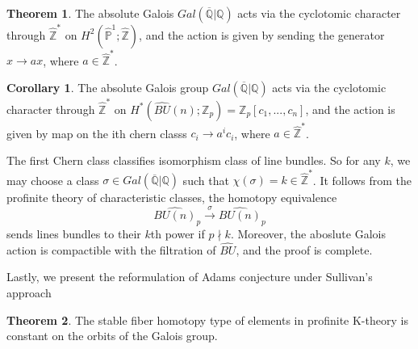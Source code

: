 \documentclass{article}
\theoremstyle{definition}
\newtheorem{theorem}{Theorem}[section]
\theoremstyle{definition}
\theoremstyle{definition}
\theoremstyle{definition}
\theoremstyle{definition}
\theoremstyle{definition}
\newtheorem{corollary}{Corollary}[theorem]
\theoremstyle{definition}
\begin{document}
\begin{tcolorbox}[colback=red!5!white,colframe=red!30!white]
\begin{theorem}
The absolute Galois $Gal(\overline{\mathbb{Q}}|\mathbb{Q})$ acts via the cyclotomic character through $\widehat{\mathbb{Z}}^*$ on $H^2(\widehat{\mathbb{P}}^1;\widehat{\mathbb{Z}})$, and the action is given by sending the generator $x\to ax$, where $a\in \widehat{\mathbb{Z}}^*$.
\end{theorem}
\end{tcolorbox}


\begin{tcolorbox}[colback=green!5!white,colframe=green!30!white]
\begin{corollary}
	The absolute Galois group $Gal(\overline{\mathbb{Q}}|\mathbb{Q})$ acts via the cyclotomic character through $\widehat{\mathbb{Z}}^*$ on $H^*(\widehat{BU}(n);\mathbb{Z}_p)=\mathbb{Z}_p[c_1,...,c_n]$, and the action is given by map on the ith chern classs $c_i\to a^ic_i$, where $a\in \widehat{\mathbb{Z}}^*$.
\end{corollary}
\end{tcolorbox}
The first Chern class classifies isomorphism class of line bundles. So for any $k$, we may choose a class $\sigma\in Gal(\overline{\mathbb{Q}}|\mathbb{Q})$ such that $\chi(\sigma)=k\in \widehat{\mathbb{Z}}^*$. It follows from the profinite theory of characteristic classes, the homotopy equivalence 
\[\widehat{BU(n)}_p\xrightarrow{\sigma} \widehat{BU(n)}_p\]
sends lines bundles to their $k$th power if $p\nmid k$. Moreover, the aboslute Galois action is compactible with the filtration of $\widehat{BU}$, and the proof is complete.

Lastly, we present the reformulation of Adams conjecture under Sullivan's approach

\begin{tcolorbox}[colback=red!5!white,colframe=red!30!white]
\begin{theorem}
	The stable fiber homotopy type of elements in profinite K-theory is constant on the orbits of the Galois group.
\end{theorem}
\end{tcolorbox}
\end{document}
